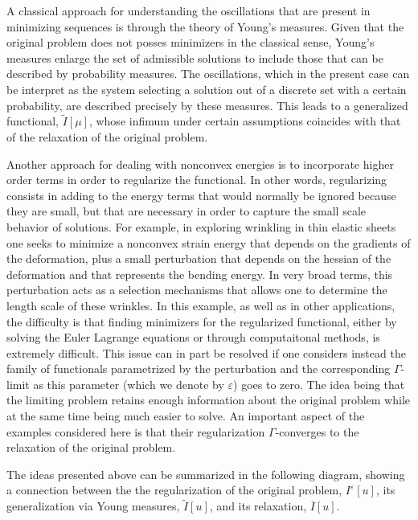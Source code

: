 \documentclass[11pt]{article}
\newcommand{\eps}{\varepsilon}
\theoremstyle{plain}
\begin{document}
A classical approach for understanding the oscillations that are present in  minimizing sequences is through the theory of Young's measures. Given that the original problem does not posses minimizers in the classical sense, Young's measures enlarge the set of admissible solutions to include those that can be described by probability measures. The oscillations, which in the present case can be interpret as the system selecting a solution out of a discrete set with a certain probability, are described precisely by these measures. This leads to a generalized functional, $\tilde{I}[\mu]$, whose infimum under certain assumptions coincides with that of the relaxation of the original problem. 
  
Another approach for dealing with nonconvex energies is to incorporate higher order terms in order to regularize the functional.  In other words, regularizing consists in adding to the energy terms that would normally be ignored because they are small, but that are necessary in order to capture the small scale behavior of solutions.  For example, in exploring wrinkling in thin elastic sheets one seeks to minimize a nonconvex strain energy that depends on the gradients of the deformation, plus a small perturbation that depends on the hessian of the deformation and that represents the bending energy. In very broad terms, this perturbation acts as a selection mechanisms that allows one to determine the length scale of these wrinkles. In this example, as well as in other applications, the difficulty is that finding minimizers for the regularized functional, either by solving the Euler Lagrange equations or through computaitonal methods, is extremely difficult. This issue can in part be resolved if one considers instead the family of functionals parametrized by the perturbation and the corresponding  $\Gamma$-limit as this parameter (which we denote by $\eps$) goes to zero. The idea being that the limiting problem retains enough information about the original problem while at the same time being much easier to solve. An important aspect of the examples considered here is that their regularization $\Gamma$-converges to the relaxation of the original problem.

The ideas presented above can be summarized in the following diagram, showing a connection between the the regularization of the original problem, $I^\eps[u]$, its generalization via Young measures, $\tilde{I}[u]$, and its relaxation, $\overline{I}[u]$.
\end{document}
